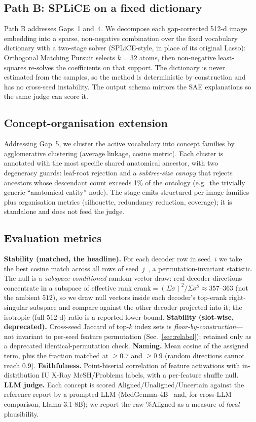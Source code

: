 \documentclass[sigconf, nonacm]{acmart}
\begin{document}
\subsection{Path B: SPLiCE on a fixed dictionary}
Path B addresses Gaps~1 and~4. We decompose each gap-corrected 512-d image embedding into a sparse, non-negative combination over the fixed vocabulary dictionary with a two-stage solver (SPLiCE-style, in place of its original Lasso): Orthogonal Matching Pursuit selects $k{=}32$ atoms, then non-negative least-squares re-solves the coefficients on that support. The dictionary is never estimated from the samples, so the method is deterministic by construction and has no cross-seed instability. The output schema mirrors the SAE explanations so the same judge can score it.

\subsection{Concept-organisation extension}
Addressing Gap~5, we cluster the active vocabulary into concept families by agglomerative clustering (average linkage, cosine metric). Each cluster is annotated with the most specific shared anatomical ancestor, with two degeneracy guards: leaf-root rejection and a \emph{subtree-size canopy} that rejects ancestors whose descendant count exceeds 1\% of the ontology (e.g.\ the trivially generic ``anatomical entity'' node). The stage emits structured per-image families plus organisation metrics (silhouette, redundancy reduction, coverage); it is standalone and does not feed the judge.

\subsection{Evaluation metrics}
\textbf{Stability (matched, the headline).} For each decoder row in seed~$i$ we take the best cosine match across all rows of seed~$j$~\cite{bricken2023monosemanticity,lan2024universality}, a permutation-invariant statistic. The null is a \emph{subspace-conditioned} random-vector draw: real decoder directions concentrate in a subspace of effective rank $\mathrm{erank}{=}(\Sigma\sigma)^2/\Sigma\sigma^2{\approx}357$--$363$ (not the ambient $512$), so we draw null vectors inside each decoder's top-$\mathrm{erank}$ right-singular subspace and compare against the other decoder projected into it; the isotropic (full-$512$-d) ratio is a reported lower bound.
\textbf{Stability (slot-wise, deprecated).} Cross-seed Jaccard of top-$k$ index sets is \emph{floor-by-construction}---not invariant to per-seed feature permutation (Sec.~\ref{sec:relabel}); retained only as a deprecated identical-permutation check.
\textbf{Naming.} Mean cosine of the assigned term, plus the fraction matched at ${\geq}0.7$ and ${\geq}0.9$ (random directions cannot reach $0.9$).
\textbf{Faithfulness.} Point-biserial correlation of feature activations with in-distribution IU X-Ray MeSH/Problems labels, with a per-feature shuffle null. \textbf{LLM judge.} Each concept is scored Aligned/Unaligned/Uncertain against the reference report by a prompted LLM (MedGemma-4B~\cite{sellergren2025medgemma} and, for cross-LLM comparison, Llama-3.1-8B); we report the raw \%Aligned as a measure of \emph{local} plausibility.
\end{document}
